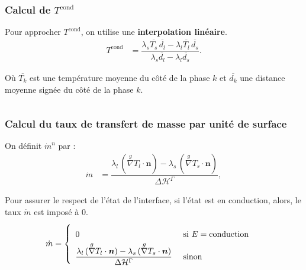 \documentclass{beamer}
\newcommand{\cond}{\text{cond}}
\newcommand{\vect}[1]{\bm{#1}}
\newcommand{\norm}{\vect{n}}
\newcommand{\ghost}{\overset{{g}}{\nabla}}
\renewcommand{\frac}{\dfrac}
\newcommand{\Frac}{\displaystyle\frac}
\begin{document}
\begin{frame}
    \frametitle{Calcul de $ T^{\cond}$}
    \footnotesize
Pour approcher $T^{\text{cond}}$, on  utilise une \textbf{interpolation linéaire}.
    \begin{align}
    T^{\text{cond}} &= \Frac{\lambda_s \overline{T_s} \, \overline{d_l} - \lambda_l \overline{T_l}  \, \overline{d_s}}{\lambda_s \overline{d_l} - \lambda_l \overline{d_s}}.
\end{align}

Où $\overline{T_k}$ est une température moyenne du côté de la phase $k$ et  $\overline{d_k}$ une distance moyenne signée du côté de la phase $k$.
\begin{columns}[c]
    \begin{column}{0.5 \textwidth}
\begin{center}
		\begin{tikzpicture}[scale = 0.55, every node/.style={scale=0.55}]
			
		\end{tikzpicture}

\end{center}
\end{column}
    \begin{column}{0.5 \textwidth}

\begin{center}
		\begin{tikzpicture}[scale = 0.5, every node/.style={scale=0.5}]
			
		\end{tikzpicture}

\end{center}
   \end{column}
   \end{columns}
\end{frame}


\begin{frame}
    \frametitle{Calcul du taux de transfert de masse par unité de surface}
	\footnotesize
On définit $\Dot{m}^n$ par : 
\begin{align} \label{eq:mPoint}
	\Dot{m} &= \frac{\lambda_l \, (\ghost T_l \cdot \norm) - \lambda_s \, (\ghost T_s \cdot \norm)}{\Delta \mathcal{H}^\Gamma},
\end{align}

Pour assurer le respect de l'état de l'interface, si l'état est en conduction, alors, le taux $\Dot{m}$ est imposé à $0$.
\begin{align}
	\Dot{m} &= \left\{ {\renewcommand{\arraystretch}{2}\begin{array}{l l} 
	0 &\text{ si } E = \text{conduction}\\
	\frac{\lambda_l \, (\ghost T_l \cdot \norm) - \lambda_s \, (\ghost T_s \cdot \norm)}{\Delta \mathcal{H}^\Gamma} &\text{ sinon }
	\end{array}}\right.	
\end{align}

\end{frame}
\end{document}
